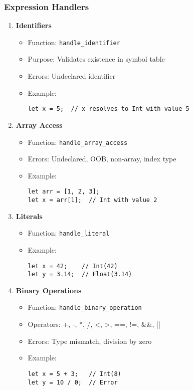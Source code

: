 \documentclass[12pt,a4paper]{article}
\begin{document}
\subsubsection*{Expression Handlers}
\begin{enumerate}
    \item \textbf{Identifiers}
    \begin{itemize}
        \item Function: \texttt{handle\_identifier}
        \item Purpose: Validates existence in symbol table
        \item Errors: Undeclared identifier
        \item Example:
        \begin{lstlisting}
let x = 5;  // x resolves to Int with value 5
        \end{lstlisting}
    \end{itemize}
    
    \item \textbf{Array Access}
    \begin{itemize}
        \item Function: \texttt{handle\_array\_access}
        \item Errors: Undeclared, OOB, non-array, index type
        \item Example:
        \begin{lstlisting}
let arr = [1, 2, 3];
let x = arr[1];  // Int with value 2
        \end{lstlisting}
    \end{itemize}
    
    \item \textbf{Literals}
    \begin{itemize}
        \item Function: \texttt{handle\_literal}
        \item Example:
        \begin{lstlisting}
let x = 42;    // Int(42)
let y = 3.14;  // Float(3.14)
        \end{lstlisting}
    \end{itemize}
    
    \item \textbf{Binary Operations}
    \begin{itemize}
        \item Function: \texttt{handle\_binary\_operation}
        \item Operators: +, -, *, /, <, >, ==, !=, \&\&, ||
        \item Errors: Type mismatch, division by zero
        \item Example:
        \begin{lstlisting}
let x = 5 + 3;   // Int(8)
let y = 10 / 0;  // Error
        \end{lstlisting}
    \end{itemize}
    

\end{enumerate}
\end{document}
